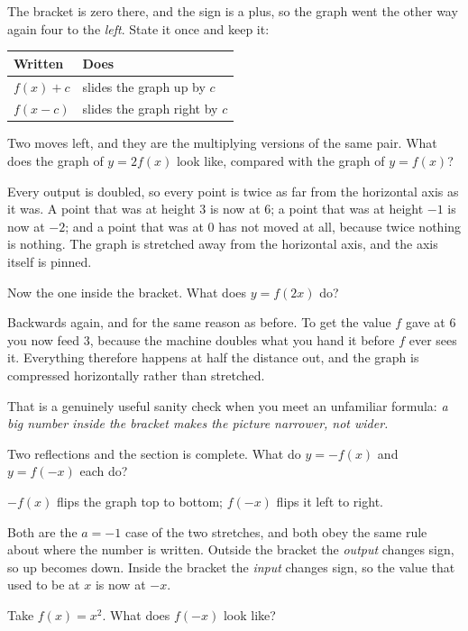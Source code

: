 \begin{fr}
The bracket is zero there, and the sign is a plus, so the graph went the other
way again \dash{} four to the \emph{left}. State it once and keep it:

\begin{center}
\begin{tabular}{ll}
\toprule
Written & Does \\
\midrule
$f(x) + c$ & slides the graph up by $c$ \\
$f(x - c)$ & slides the graph right by $c$ \\
\bottomrule
\end{tabular}
\end{center}

Two moves left, and they are the multiplying versions of the same pair. What
does the graph of $y = 2f(x)$ look like, compared with the graph of $y = f(x)$?
\nextframe
\end{fr}

\begin{fr}
Every output is doubled, so every point is twice as far from the horizontal
axis as it was. A point that was at height $3$ is now at $6$; a point that was
at height $-1$ is now at $-2$; and a point that was at $0$ has not moved at
all, because twice nothing is nothing. The graph is stretched away from the
horizontal axis, and the axis itself is pinned.

Now the one inside the bracket. What does $y = f(2x)$ do?
\nextframe
\end{fr}

\begin{fr}
Backwards again, and for the same reason as before. To get the value $f$ gave
at $6$ you now feed $3$, because the machine doubles what you hand it before
$f$ ever sees it. Everything therefore happens at half the distance out, and
the graph is compressed horizontally rather than stretched.

That is a genuinely useful sanity check when you meet an unfamiliar formula:
\emph{a big number inside the bracket makes the picture narrower, not wider.}

Two reflections and the section is complete. What do $y = -f(x)$ and
$y = f(-x)$ each do?
\nextframe
\end{fr}

\begin{fr}
\begin{ansblock}
$-f(x)$ flips the graph top to bottom; $f(-x)$ flips it left to right.
\end{ansblock}

Both are the $a = -1$ case of the two stretches, and both obey the same rule
about where the number is written. Outside the bracket the \emph{output}
changes sign, so up becomes down. Inside the bracket the \emph{input} changes
sign, so the value that used to be at $x$ is now at $-x$.

Take $f(x) = x^{2}$. What does $f(-x)$ look like?
\nextframe
\end{fr}

